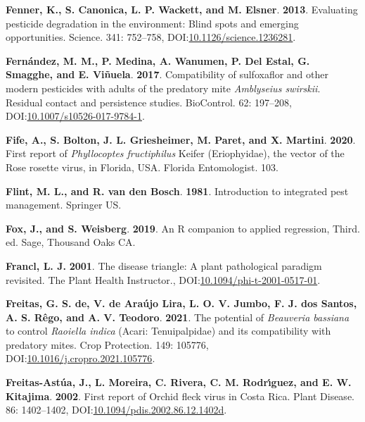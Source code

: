 \documentclass[12pt,final,CPage]{ufthesis}
\newlength{\cslhangindent}
\newenvironment{CSLReferences}[2] %
{%
	\setlength{\parindent}{0pt}
	\ifodd #1 \everypar{\setlength{\hangindent}{\cslhangindent}}\ignorespaces\fi
	\ifnum #2 > 0
	\setlength{\parskip}{#2\baselineskip}
	\fi
}%
{}
\begin{document}
{\begin{CSLReferences}{1}{0}
  \leavevmode{}%
  \textbf{Fenner, K., S. Canonica, L. P. Wackett, and M. Elsner}. \textbf{2013}. Evaluating pesticide degradation in the environment: Blind spots and emerging opportunities. Science. 341: 752--758, DOI:\href{https://doi.org/10.1126/science.1236281}{10.1126/science.1236281}.

  \leavevmode{}%
  \textbf{Fernández, M. M., P. Medina, A. Wanumen, P. Del Estal, G. Smagghe, and E. Viñuela}. \textbf{2017}. Compatibility of sulfoxaflor and other modern pesticides with adults of the predatory mite {\emph{Amblyseius swirskii}}. Residual contact and persistence studies. {BioControl}. 62: 197--208, DOI:\href{https://doi.org/10.1007/s10526-017-9784-1}{10.1007/s10526-017-9784-1}.

  \leavevmode{}%
  \textbf{Fife, A., S. Bolton, J. L. Griesheimer, M. Paret, and X. Martini}. \textbf{2020}. First report of {\emph{Phyllocoptes fructiphilus}} {Keifer} ({Eriophyidae}), the vector of the {Rose rosette virus}, in {Florida}, {USA}. Florida Entomologist. 103.

  \leavevmode{}%
  \textbf{Flint, M. L., and R. van den Bosch}. \textbf{1981}. Introduction to integrated pest management. Springer {US}.

  \leavevmode{}%
  \textbf{Fox, J., and S. Weisberg}. \textbf{2019}. An {R} companion to applied regression, Third. ed. Sage, Thousand Oaks {CA}.

  \leavevmode{}%
  \textbf{Francl, L. J.} \textbf{2001}. The disease triangle: A plant pathological paradigm revisited. The Plant Health Instructor., DOI:\href{https://doi.org/10.1094/phi-t-2001-0517-01}{10.1094/phi-t-2001-0517-01}.

  \leavevmode{}%
  \textbf{Freitas, G. S. de, V. de Araújo Lira, L. O. V. Jumbo, F. J. dos Santos, A. S. Rêgo, and A. V. Teodoro}. \textbf{2021}. The potential of {\emph{Beauveria bassiana}} to control {\emph{Raoiella indica}} ({Acari}: {Tenuipalpidae}) and its compatibility with predatory mites. Crop Protection. 149: 105776, DOI:\href{https://doi.org/10.1016/j.cropro.2021.105776}{10.1016/j.cropro.2021.105776}.

  \leavevmode{}%
  \textbf{Freitas-Astúa, J., L. Moreira, C. Rivera, C. M. Rodrı́guez, and E. W. Kitajima}. \textbf{2002}. First report of {Orchid fleck virus} in {Costa Rica}. Plant Disease. 86: 1402--1402, DOI:\href{https://doi.org/10.1094/pdis.2002.86.12.1402d}{10.1094/pdis.2002.86.12.1402d}.


\end{CSLReferences}}
\end{document}

